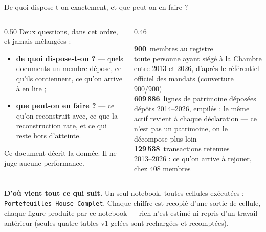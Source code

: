 \documentclass[11pt,aspectratio=169]{beamer}
\newcommand{\co}[1]{\texttt{#1}}
\newcommand{\kpi}[3]{{\large\textbf{\textcolor{#1}{#2}}}~{\footnotesize #3}}
\newcommand{\defl}[1]{{\scriptsize\color{black!55}#1}}
\begin{document}
\begin{frame}{De quoi dispose-t-on exactement, et que peut-on en faire ?}
  \begin{columns}[T]
    \begin{column}{0.50\textwidth}
      \footnotesize
      Deux questions, dans cet ordre, et jamais mélangées :
      \begin{itemize}\itemsep2.5pt
        \item \textbf{de quoi dispose-t-on ?} --- quels documents un membre dépose,
              ce qu'ils contiennent, ce qu'on arrive à en lire ;
        \item \textbf{que peut-on en faire ?} --- ce qu'on reconstruit avec,
              ce que la reconstruction rate, et ce qui reste hors d'atteinte.
      \end{itemize}
      \vspace{2mm}
      \defl{Ce document décrit la donnée. Il ne juge aucune performance.}
    \end{column}
    \begin{column}{0.46\textwidth}
      \footnotesize\raggedright
      \kpi{helec}{900}{membres au registre}\\
      \defl{toute personne ayant siégé à la Chambre entre 2013 et 2026,
        d'après le référentiel officiel des mandats (couverture 900/900)}\\[2.5mm]
      \kpi{dataC}{609\,886}{lignes de patrimoine déposées}\\
      \defl{dépôts 2014--2026, empilés : le même actif revient à chaque
        déclaration --- ce n'est pas un patrimoine, on le décompose plus loin}\\[2.5mm]
      \kpi{okgreen}{129\,538}{transactions retenues}\\
      \defl{2013--2026 : ce qu'on arrive à rejouer, chez 408 membres}
    \end{column}
  \end{columns}
  \vspace{2.5mm}
  \colorbox{black!5}{\parbox{\dimexpr\textwidth-8pt}{\scriptsize\vspace{0.5mm}
    \textbf{D'où vient tout ce qui suit.} Un seul notebook, toutes cellules exécutées :
    \co{Portefeuilles\_House\_Complet}. Chaque chiffre est recopié d'une sortie de cellule, chaque
    figure produite par ce notebook --- rien n'est estimé ni repris d'un travail antérieur (seules
    quatre tables v1 gelées sont rechargées et recomptées).\vspace{0.5mm}}}
\end{frame}
\end{document}
